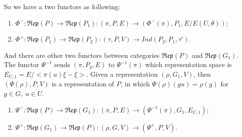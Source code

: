 \documentclass[12pt,a4paper,english]{article}
\theoremstyle{plain}
\theoremstyle{definition}
\begin{document}
So we have a two functors as following:
\begin{enumerate}
    \item $\Phi^{-}:\mathfrak{Rep}(P)\rightarrow \mathfrak{Rep}(P_{1}): (\pi,P,E)\rightarrow (\Phi^{-}(\pi),P_{1}, E/E(U,\theta))$;
    \item $\Phi^{+}:\mathfrak{Rep}(P_{1})\rightarrow \mathfrak{Rep}(P_{2}):(\tau, P, V)\rightarrow Ind(P_{2},P_{1},\tau')$.
\end{enumerate}
And there are other two functors between categories $\mathfrak{Rep}(P)$ and $\mathfrak{Rep}(G_{1})$. The functor $\Psi^{-1}$ sends $(\pi, P_{2},E)$ to $\Psi^{-1}(\pi)$ which representation space is $E_{U,1}=E/<\pi(u)\xi-\xi>$. Given a representation $(\rho,G_{1},V)$, then $(\Psi(\rho),P,V)$ is a representation of $P$, in which $\Psi(\rho)(gu)=\rho(g)$ for $g\in G,\ u\in U$.
\begin{enumerate}
    \item $\Psi^{-}:\mathfrak{Rep}(P)\rightarrow \mathfrak{Rep}(G_{1}):(\pi, P, E)\rightarrow (\Psi^{-1}(\pi),G_{1},E_{U,1})$;
    \item $\Psi^{+}:\mathfrak{Rep}(G_{1})\rightarrow \mathfrak{Rep}(P):(\rho, G, V)\rightarrow (\Psi^{+}, P, V)$.
\end{enumerate}
\end{document}
